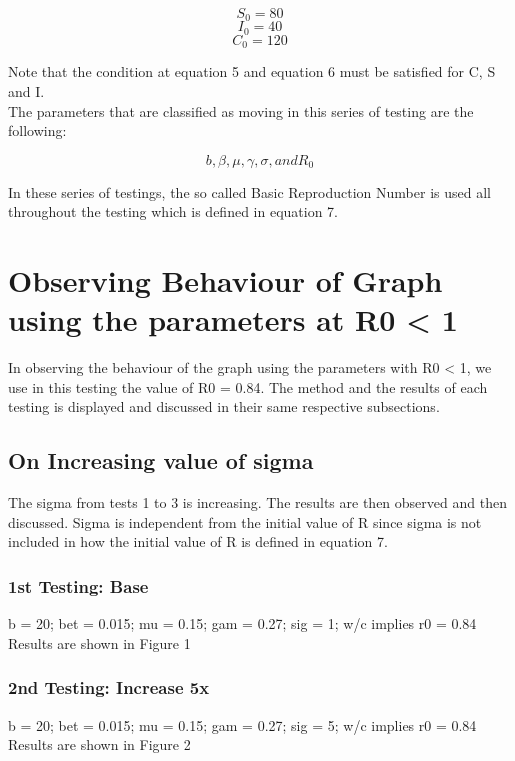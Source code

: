 \documentclass{acm_proc_article-sp}
\begin{document}
\begin{equation}
S_0  = 80
\end{equation}
\begin{equation}
I_0  = 40
\end{equation}
\begin{equation}
C_0  = 120
\end{equation}

Note that the condition at equation 5 and equation 6 must be satisfied for C, S and I.\\
The parameters that are classified as moving in this series of testing are the following:

\begin{equation}
b, \beta, \mu, \gamma, \sigma, and R_0
\end{equation}

In these series of testings, the so called Basic Reproduction Number is used all throughout the testing which is defined in equation 7.

\section{Observing Behaviour of Graph using the parameters at R0 < 1}
In observing the behaviour of the graph using the parameters with R0 < 1, we use in this testing the value of R0 = 0.84. The method and the results of each testing is displayed and discussed in their same respective subsections.

\subsection{On Increasing value of sigma}
The sigma from tests 1 to 3 is increasing. The results are then observed and then discussed. Sigma is independent from the initial value of R since sigma is not included in how the initial value of R is defined in equation 7.

\subsubsection{1st Testing: Base}
b = 20; bet = 0.015; mu = 0.15; gam = 0.27; sig = 1; w/c implies r0 = 0.84\\
Results are shown in Figure 1

\subsubsection{2nd Testing: Increase 5x}
b = 20; bet = 0.015; mu = 0.15; gam = 0.27; sig = 5; w/c implies r0 = 0.84\\
Results are shown in Figure 2
\end{document}
